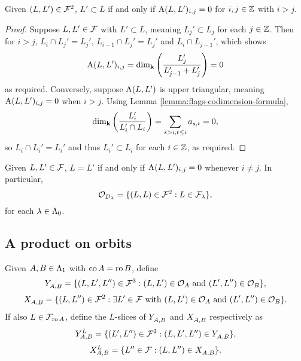 \documentclass[a4paper, 11pt]{report}
\begin{document}
\begin{lemma}
Given $(L,L')\in\flags^2$, $L'\subset L$ if and only if $\type{L}{L'}_{i,j}=0$ for $i,j\in\integers$ with $i>j$.
\end{lemma}
\begin{proof}
Suppose $L,L'\in\flags$ with $L'\subset L$, meaning $L_j'\subset L_j$ for each $j\in\integers$. Then for $i>j$, $L_i\cap L_j' = L_j'$, $L_{i-1}\cap L_j' = L_j'$ and $L_i\cap L_{j-1}'$, which shows
\begin{equation*}
\type{L}{L'}_{i,j} = \dim_\field\left(\frac{L_j'}{L_{j-1}'+L_j'}\right) = 0
\end{equation*}
as required. Conversely, suppose $\type{L}{L'}$ is upper triangular, meaning $\type{L}{L'}_{i,j}=0$ when $i>j$. Using Lemma \ref{lemma:flags-codimension-formula},
\begin{equation*}
\dim_\field\left(\frac{L_i'}{L_i'\cap L_i}\right) = \sum_{s>i,t\le i} a_{s,t} = 0,
\end{equation*}
so $L_i\cap L_i' = L_i'$ and thus $L_i'\subset L_i$ for each $i\in\integers$, as required.
\end{proof}

\begin{corollary}\label{corollary:diagonal-orbits}
Given $L,L'\in\flags$, $L=L'$ if and only if $\type{L}{L'}_{i,j}=0$ whenever $i\neq j$. In particular,
\begin{equation*}
\orbit{D_\lambda} = \{(L,L)\in\flags^2: L\in\flags_\lambda\},
\end{equation*}
for each $\lambda\in\compositions$.
\end{corollary}

\subsection{A product on orbits}\label{sec:orbit-product}

Given $A,B\in\matrices$ with $\co{A}=\ro{B}$, define
\begin{equation*}
\yprod{A,B} = \{ (L,L',L'')\in\flags^3: (L,L')\in\orbit{A} \text{ and } (L',L'')\in\orbit{B}\},
\end{equation*}
\begin{equation*}
\xprod{A,B} = \{(L,L'')\in\flags^2:\exists L'\in\flags\text{ with } (L,L')\in\orbit{A} \text{ and } (L',L'')\in\orbit{B}\}.
\end{equation*}
If also $L\in\flags_{\ro{A}}$, define the $L$-slices of $\yprod{A,B}$ and $\xprod{A,B}$ respectively as
\begin{equation*}
\yprod[L]{A,B} = \{(L',L'')\in\flags^2: (L,L',L'')\in\yprod{A,B}\},
\end{equation*}
\begin{equation*}
\xprod[L]{A,B} = \{L''\in\flags: (L,L'')\in\xprod{A,B}\}.
\end{equation*}
\end{document}
